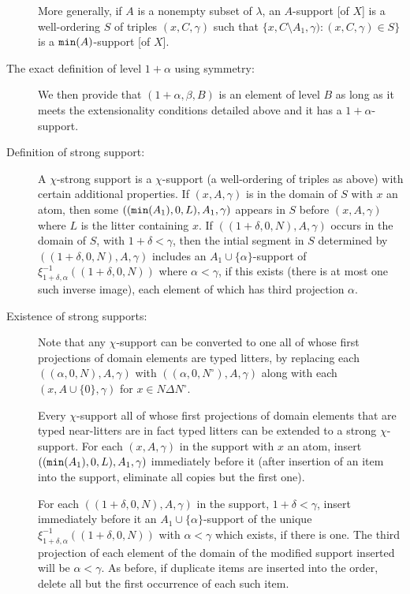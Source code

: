 \documentclass[12pt]{article}
\begin{document}
\begin{description}
More generally, if $A$ is a nonempty subset of $\lambda$, an $A$-support [of $X$] is a well-ordering $S$ of triples $(x,C,\gamma)$ such that 
$\{x,C \setminus A_1,\gamma):(x,C,\gamma) \in S\}$ is a ${\tt min}(A)$-support [of $X$].

\item[The exact definition of level $1+\alpha$ using symmetry:]

We then provide that $(1+\alpha,\beta,B)$ is an element of level $B$ as long as it meets the extensionality conditions detailed above and it has a $1+\alpha$-support.

\item[Definition of strong support:]

A $\chi$-strong support is a $\chi$-support (a well-ordering of triples as above) with certain additional properties.  If $(x,A,\gamma)$ is in the domain of $S$ with $x$ an atom, then some
$(({\tt min}(A_1),0,L),A_1,\gamma)$ appears in $S$ before $(x,A,\gamma)$  where $L$ is the litter containing $x$.  If $((1+\delta,0,N),A,\gamma)$ occurs
in the domain of $S$, with $1+\delta<\gamma$, then the intial segment in $S$ determined by $((1+\delta,0,N),A,\gamma)$ includes an $A_1 \cup \{\alpha\}$-support of $\xi_{1+\delta,\alpha}^{-1}((1+\delta,0,N))$ where $\alpha< \gamma$, if this exists (there is at most one such inverse image), each element of which has third projection $\alpha$.

\item[Existence of strong supports:]

Note that any $\chi$-support can be converted to one all of whose first projections of domain elements are typed litters, by replacing each $((\alpha,0,N),A,\gamma)$ with
$((\alpha,0,N^\circ),A,\gamma)$ along with each $(x,A\cup\{0\},\gamma)$ for $x \in N \Delta N^\circ$.

Every $\chi$-support all of whose first projections of domain elements that are typed near-litters are in fact typed litters can be extended to a strong $\chi$-support.  For each $(x,A,\gamma)$ in the support
with $x$ an atom, insert $(({\tt min}(A_1),0,L),A_1,\gamma)$ immediately before it (after insertion of an item into the support, eliminate all copies but the first one).

For each $((1+\delta,0,N),A,\gamma)$ in the support, $1+\delta<\gamma$, insert immediately before it an $A_1 \cup \{\alpha\}$-support of the unique $\xi_{1+\delta,\alpha}^{-1}((1+\delta,0,N))$ with $\alpha<\gamma$ which exists, if there is one.  The third projection of each element of the domain of the modified support inserted will be $\alpha<\gamma$.  As before, if duplicate items are inserted into the order, delete all but the first occurrence of each such item.


\end{description}
\end{document}
